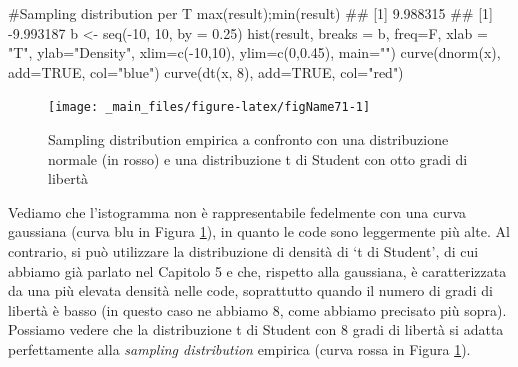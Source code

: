 \documentclass[a4paper,12pt,oneside]{book}
\newenvironment{Shaded}{\begin{snugshade}}{\end{snugshade}}
\newcommand{\DecValTok}[1]{#1}
\newcommand{\FloatTok}[1]{#1}
\newcommand{\ConstantTok}[1]{#1}
\newcommand{\SpecialCharTok}[1]{#1}
\newcommand{\StringTok}[1]{#1}
\newcommand{\CommentTok}[1]{#1}
\newcommand{\DocumentationTok}[1]{#1}
\newcommand{\OtherTok}[1]{#1}
\newcommand{\FunctionTok}[1]{#1}
\newcommand{\AttributeTok}[1]{#1}
\newcommand{\NormalTok}[1]{#1}
\begin{document}
\begin{Shaded}
\begin{Highlighting}[]
\CommentTok{\#Sampling distribution per T }
\FunctionTok{max}\NormalTok{(result);}\FunctionTok{min}\NormalTok{(result)}
\DocumentationTok{\#\# [1] 9.988315}
\DocumentationTok{\#\# [1] {-}9.993187}
\NormalTok{b }\OtherTok{\textless{}{-}} \FunctionTok{seq}\NormalTok{(}\SpecialCharTok{{-}}\DecValTok{10}\NormalTok{, }\DecValTok{10}\NormalTok{, }\AttributeTok{by =} \FloatTok{0.25}\NormalTok{)}
\FunctionTok{hist}\NormalTok{(result, }\AttributeTok{breaks =}\NormalTok{ b, }\AttributeTok{freq=}\NormalTok{F, }
  \AttributeTok{xlab =} \StringTok{"T"}\NormalTok{, }\AttributeTok{ylab=}\StringTok{"Density"}\NormalTok{, }
  \AttributeTok{xlim=}\FunctionTok{c}\NormalTok{(}\SpecialCharTok{{-}}\DecValTok{10}\NormalTok{,}\DecValTok{10}\NormalTok{), }\AttributeTok{ylim=}\FunctionTok{c}\NormalTok{(}\DecValTok{0}\NormalTok{,}\FloatTok{0.45}\NormalTok{), }\AttributeTok{main=}\StringTok{""}\NormalTok{)}
\FunctionTok{curve}\NormalTok{(}\FunctionTok{dnorm}\NormalTok{(x), }\AttributeTok{add=}\ConstantTok{TRUE}\NormalTok{, }\AttributeTok{col=}\StringTok{"blue"}\NormalTok{)}
\FunctionTok{curve}\NormalTok{(}\FunctionTok{dt}\NormalTok{(x, }\DecValTok{8}\NormalTok{), }\AttributeTok{add=}\ConstantTok{TRUE}\NormalTok{, }\AttributeTok{col=}\StringTok{"red"}\NormalTok{)}
\end{Highlighting}
\end{Shaded}

\begin{figure}

{\centering \texttt{[image: \_main\_files/figure-latex/figName71-1]} 

}

\caption{Sampling distribution empirica a confronto con una distribuzione normale (in rosso) e una distribuzione t di Student con otto gradi di libertà}\label{fig:figName71}
\end{figure}

Vediamo che l'istogramma non è rappresentabile fedelmente con una curva gaussiana (curva blu in Figura \ref{fig:figName71}), in quanto le code sono leggermente più alte. Al contrario, si può utilizzare la distribuzione di densità di `t di Student', di cui abbiamo già parlato nel Capitolo 5 e che, rispetto alla gaussiana, è caratterizzata da una più elevata densità nelle code, soprattutto quando il numero di gradi di libertà è basso (in questo caso ne abbiamo 8, come abbiamo precisato più sopra). Possiamo vedere che la distribuzione t di Student con 8 gradi di libertà si adatta perfettamente alla \emph{sampling distribution} empirica (curva rossa in Figura \ref{fig:figName71}).
\end{document}
